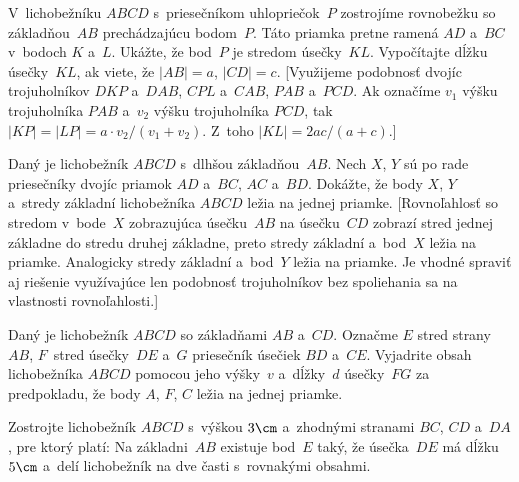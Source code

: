 {
V~lichobežníku $ABCD$ s~priesečníkom uhlopriečok~$P$ zostrojíme rovnobežku so základňou~$AB$
prechádzajúcu bodom~$P$. Táto priamka pretne ramená $AD$ a~$BC$ v~bodoch $K$ a~$L$. Ukážte, že bod~$P$
je stredom úsečky~$KL$. Vypočítajte dĺžku úsečky~$KL$, ak viete, že $|AB|=a$, $|CD|=c$.
[Využijeme podobnosť dvojíc trojuholníkov
$DKP$ a~$DAB$, $CPL$ a~$CAB$, $PAB$ a~$PCD$. Ak označíme $v_1$ výšku trojuholníka $PAB$
a~$v_2$ výšku trojuholníka $PCD$, tak $|KP| = |LP| = a\cdot v_2/(v_1+v_2)$.
Z~toho $|KL| = 2ac/(a+c)$.]

Daný je lichobežník $ABCD$ s~dlhšou základňou~$AB$.
Nech $X$, $Y$ sú po rade priesečníky dvojíc priamok $AD$ a~$BC$, $AC$ a~$BD$.
Dokážte, že body $X$, $Y$ a~stredy základní lichobežníka $ABCD$ ležia na jednej priamke.
[Rovnoľahlosť so stredom v~bode~$X$ zobrazujúca úsečku~$AB$ na úsečku~$CD$
zobrazí stred jednej základne do stredu druhej základne, preto stredy
základní a~bod~$X$ ležia na priamke. Analogicky stredy základní
a~bod~$Y$ ležia na priamke. Je vhodné spraviť aj riešenie využívajúce
len podobnosť trojuholníkov bez spoliehania sa na vlastnosti rovnoľahlosti.]

\D
Daný je lichobežník $ABCD$ so základňami $AB$ a~$CD$. Označme $E$ stred strany~$AB$,
$F$~stred úsečky~$DE$ a~$G$ priesečník úsečiek $BD$ a~$CE$. Vyjadrite obsah lichobežníka
$ABCD$ pomocou jeho výšky~$v$ a~dĺžky~$d$ úsečky~$FG$ za predpokladu, že body $A$, $F$, $C$
ležia na jednej priamke.
\vpravo{[56-C-I-4]}

Zostrojte lichobežník $ABCD$ s~výškou $3\cm$ a~zhodnými stranami $BC$, $CD$ a~$DA$,
pre ktorý platí: Na základni~$AB$ existuje bod~$E$ taký, že úsečka~$DE$ má dĺžku $5\cm$ a~delí
lichobežník na dve časti s~rovnakými obsahmi.
\vpravo{[52-C-I-4]}
}

